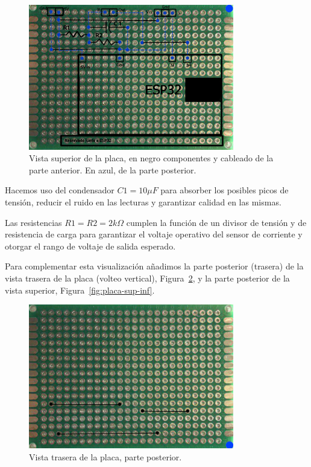 \documentclass[a4paper,10pt]{article}
\begin{document}
\begin{figure}
  \centering
  \includegraphics[width=0.8\textwidth]{img/dibujo_placa_vista_superior_arriba_y_abajo.png}
  \caption{Vista superior de la placa, en negro componentes y cableado
  de la parte anterior. En azul, de la parte posterior.}\label{fig:placa-sup-arriba-abajo}
\end{figure}

Hacemos uso del condensador $C1 = 10\mu F$ para absorber los
posibles picos de tensión, reducir el ruido en las lecturas y
garantizar calidad en las mismas.

Las resistencias $R1=R2=2k\Omega$ cumplen la función de un divisor de
tensión y de resistencia de carga para garantizar el voltaje operativo
del sensor de corriente y otorgar el rango de voltaje de salida esperado.

Para complementar esta visualización añadimos la parte posterior (trasera) de la
vista trasera de la placa (volteo vertical), Figura~\ref{fig:placa-tras-inf},
y la parte posterior de la vista superior, Figura~\ref{fig:placa-sup-inf}.

\begin{figure}
  \centering
  \includegraphics[width=0.8\textwidth]{img/dibujo_placa_vista_inferior_parte_trasera.png}
  \caption{Vista trasera de la placa, parte posterior.}\label{fig:placa-tras-inf}
\end{figure}
\end{document}
